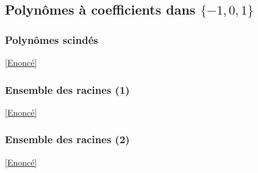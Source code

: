 \documentclass{book}
\begin{document}
	\subsection{Polynômes à coefficients dans $\{-1,0,1\}$}
	
	
	\subsubsection{Polynômes scindés}
	\label{sec:polynômes-scindés}
	\textcolor{blue}{\hyperref[Polynômes scindés]{[Enoncé]}}\\
	
	\subsubsection{Ensemble des racines (1)}
	\label{sec:ensemble-des-racines-(1)}
	\textcolor{blue}{\hyperref[Ensemble des racines (1)]{[Enoncé]}}\\
	
	\subsubsection{Ensemble des racines (2)}
	\label{sec:ensemble-des-racines-(2)}
	\textcolor{blue}{\hyperref[Ensemble des racines (2)]{[Enoncé]}}\\
	
\end{document}
